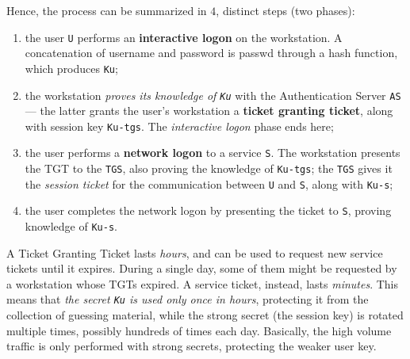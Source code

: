 \documentclass[10pt]{extreport}
\begin{document}
\clearpage


Hence, the process can be summarized in $4$, distinct steps (two phases):
\begin{enumerate}
    \item the user \texttt{U} performs an \textbf{interactive logon} on the
        workstation. A concatenation of username and password is passwd through
        a hash function, which produces \texttt{Ku};
    \item the workstation \emph{proves its knowledge of \texttt{Ku}} with the
        Authentication Server \texttt{AS} --- the latter grants the user's
        workstation a \textbf{ticket granting ticket}, along with session key
        \texttt{Ku-tgs}. The \emph{interactive logon} phase ends here;
    \item the user performs a \textbf{network logon} to a service \texttt{S}.
        The workstation presents the TGT to the \texttt{TGS}, also proving the
        knowledge of \texttt{Ku-tgs}; the \texttt{TGS} gives it the
        \emph{session ticket} for the communication between \texttt{U} and
        \texttt{S}, along with \texttt{Ku-s};
    \item the user completes the network logon by presenting the ticket to
        \texttt{S}, proving knowledge of \texttt{Ku-s}.
\end{enumerate}

A Ticket Granting Ticket lasts \emph{hours}, and can be used to request new
service tickets until it expires. During a single day, some of them might be
requested by a workstation whose TGTs expired. A service ticket, instead, lasts
\emph{minutes}. This means that \emph{the secret \texttt{Ku} is used only once
in hours}, protecting it from the collection of guessing material, while the
strong secret (the session key) is rotated multiple times, possibly hundreds of
times each day. Basically, the high volume traffic is only performed with
strong secrets, protecting the weaker user key.
\end{document}
